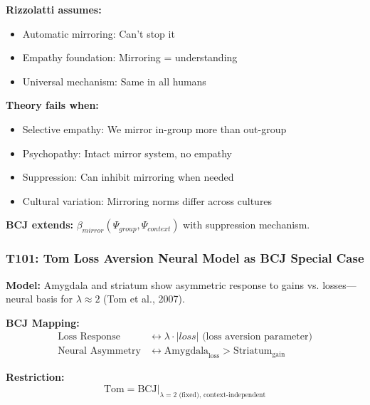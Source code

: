 \begin{tcolorbox}[colback=red!5!white, colframe=red!75!black,
    title=Boundary Condition: Where Rizzolatti Fails]
\textbf{Rizzolatti assumes:}
\begin{itemize}[nosep]
\item Automatic mirroring: Can't stop it
\item Empathy foundation: Mirroring = understanding
\item Universal mechanism: Same in all humans
\end{itemize}

\textbf{Theory fails when:}
\begin{itemize}[nosep]
\item Selective empathy: We mirror in-group more than out-group
\item Psychopathy: Intact mirror system, no empathy
\item Suppression: Can inhibit mirroring when needed
\item Cultural variation: Mirroring norms differ across cultures
\end{itemize}

\textbf{BCJ extends:} $\beta_{mirror}(\Psi_{group}, \Psi_{context})$ with suppression mechanism.
\end{tcolorbox}

\subsubsection*{T101: Tom Loss Aversion Neural Model as BCJ Special Case}

\textbf{Model:} Amygdala and striatum show asymmetric response to gains vs. losses---neural basis for $\lambda \approx 2$ (Tom et al., 2007).

\textbf{BCJ Mapping:}
\begin{align}
\text{Loss Response} &\leftrightarrow \lambda \cdot |loss| \text{ (loss aversion parameter)} \\
\text{Neural Asymmetry} &\leftrightarrow \text{Amygdala}_{\text{loss}} > \text{Striatum}_{\text{gain}}
\end{align}

\textbf{Restriction:}
\begin{equation}
\text{Tom} = \text{BCJ} \big|_{\lambda = 2 \text{ (fixed)}, \, \text{context-independent}}
\end{equation}


